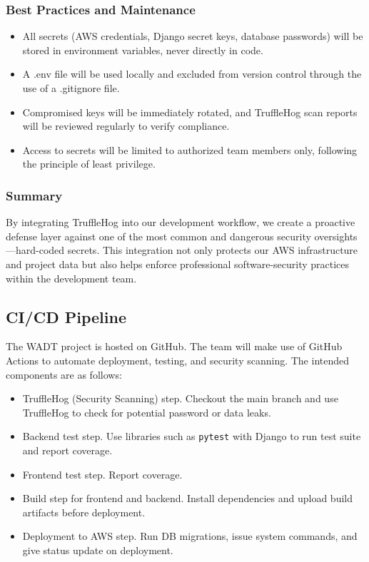 \documentclass[12pt,titlepage]{article}
\begin{document}
\subsubsection{Best Practices and Maintenance}
\begin{itemize}
    \item All secrets (AWS credentials, Django secret keys, database passwords) will be stored in environment variables, never directly in code.
    \item A .env file will be used locally and excluded from version control through the use of a .gitignore file.
    \item Compromised keys will be immediately rotated, and TruffleHog scan reports will be reviewed regularly to verify compliance.
    \item Access to secrets will be limited to authorized team members only, following the principle of least privilege.
\end{itemize}

\subsubsection{Summary}
By integrating TruffleHog into our development workflow, we create a proactive defense layer against one of the most common and dangerous security oversights—hard-coded secrets. This integration not only protects our AWS infrastructure and project data but also helps enforce professional software-security practices within the development team.

\subsection{CI/CD Pipeline}
The WADT project is hosted on GitHub. The team will make use of GitHub Actions to automate deployment, testing, and security scanning.
The intended components are as follows:
\begin{itemize}
	\item TruffleHog (Security Scanning) step. Checkout the main branch and use TruffleHog to check for potential password or data leaks.
	\item Backend test step. Use libraries such as \texttt{pytest} with Django to run test suite and report coverage.
	\item Frontend test step. Report coverage.
	\item Build step for frontend and backend. Install dependencies and upload build artifacts before deployment.
	\item Deployment to AWS step. Run DB migrations, issue system commands, and give status update on deployment.
\end{itemize}
\end{document}
